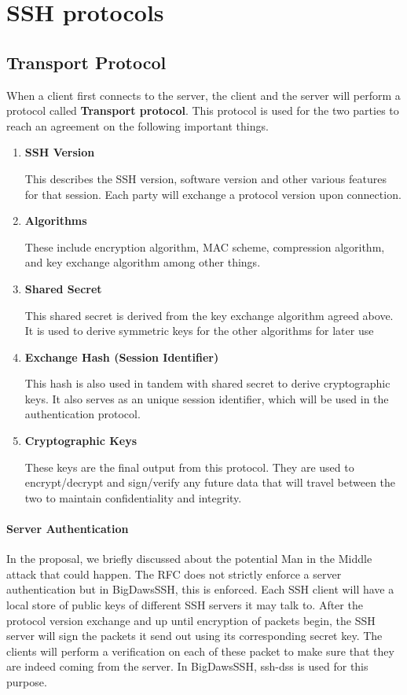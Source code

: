 \documentclass[10pt,sigconf]{acmart}
\begin{document}
\section{SSH protocols}
\subsection{Transport Protocol}
When a client first connects to the server, the client and the server will perform a protocol called \textbf{Transport protocol}. This protocol is used for the two parties to reach an agreement on the following important things.
\begin{enumerate}
  \item \textbf{SSH Version} 
  
  This describes the SSH version, software version and other various features for that session. Each party will exchange a protocol version upon connection.
  \item \textbf{Algorithms}
  
  These include encryption algorithm, MAC scheme, compression algorithm, and key exchange algorithm among other things.
  \item \textbf{Shared Secret}
  
  This shared secret is derived from the key exchange algorithm agreed above. It is used to derive symmetric keys for the other algorithms for later use
  \item \textbf{Exchange Hash (Session Identifier)}
  
  This hash is also used in tandem with shared secret to derive cryptographic keys. It also serves as an unique session identifier, which will be used in the authentication protocol.
  \item \textbf{Cryptographic Keys}
  
  These keys are the final output from this protocol. They are used to encrypt/decrypt and sign/verify any future data that will travel between the two to maintain confidentiality and integrity.
\end{enumerate}
\paragraph{\textbf{Server Authentication}}
In the proposal, we briefly discussed about the potential Man in the Middle attack that could happen. The RFC does not strictly enforce a server authentication but in BigDawsSSH, this is enforced. Each SSH client will have a local store of public keys of different SSH servers it may talk to. After the protocol version exchange and up until encryption of packets begin, the SSH server will sign the packets it send out using its corresponding secret key. The clients will perform a verification on each of these packet to make sure that they are indeed coming from the server. In BigDawsSSH, ssh-dss is used for this purpose.
\end{document}
